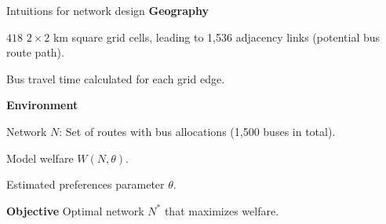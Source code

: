 \documentclass[notes,11pt, aspectratio=169]{beamer}
\newenvironment{wideitemize}{\itemize\addtolength{\itemsep}{0.4em}}{\enditemize}
\begin{document}
\begin{frame}{Intuitions for network design}
	\textbf{Geography}
	\begin{wideitemize}
	\item $418$ $2\times 2$ km square grid cells, leading to 1,536 adjacency links (potential bus route path).
	\item Bus travel time calculated for each grid edge.
	\end{wideitemize}\vspace{1em}

	\textbf{Environment}
	\begin{wideitemize}
	\item Network $N$: Set of routes with bus allocations (1,500 buses in total).	
	\item Model welfare $W(N, \theta)$.
	\item Estimated preferences parameter $\theta$.
	\end{wideitemize}\vspace{0.5em}

	\begin{block}{\centering \textbf{Objective}}
		\centering
		Optimal network $N^*$ that maximizes welfare.	
	\end{block}
\end{frame}
\end{document}
